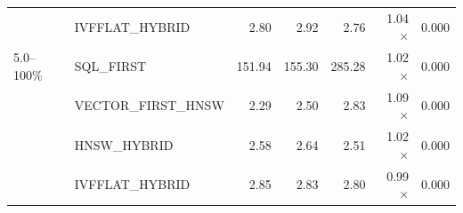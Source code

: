 \begin{table}[t]
{\begin{tabular}{l l r r r r r}
           & IVFFLAT\_HYBRID     &   2.80 &   2.92 &   2.76 & 1.04$\times$ & 0.000 \\
5.0--100\% & SQL\_FIRST         & 151.94 & 155.30 & 285.28 & 1.02$\times$ & 0.000 \\
           & VECTOR\_FIRST\_HNSW &   2.29 &   2.50 &   2.83 & 1.09$\times$ & 0.000 \\
           & HNSW\_HYBRID        &   2.58 &   2.64 &   2.51 & 1.02$\times$ & 0.000 \\
           & IVFFLAT\_HYBRID     &   2.85 &   2.83 &   2.80 & 0.99$\times$ & 0.000 \\
\hline
\end{tabular}}
\end{table}
